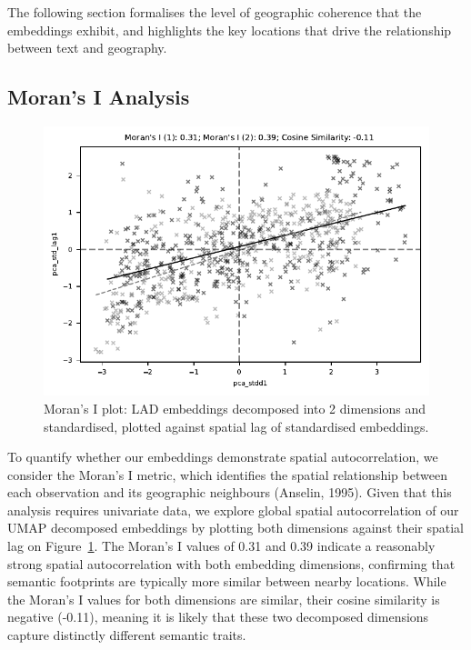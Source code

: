 \documentclass[
  letterpaper,
  11pt,
  english,
  onehalfspacing,
  headsepline]{MastersDoctoralThesis}
\begin{document}
The following section formalises the level of geographic coherence that
the embeddings exhibit, and highlights the key locations that drive the
relationship between text and geography.

\hypertarget{morans-i-analysis}{%
\subsection{Moran's I Analysis}\label{morans-i-analysis}}

\begin{figure}

{\centering \includegraphics{05_footprint/05_figures/fig-morans-output-1.pdf}

}

\caption{\label{fig-morans}Moran's I plot: LAD embeddings decomposed
into 2 dimensions and standardised, plotted against spatial lag of
standardised embeddings.}

\end{figure}

To quantify whether our embeddings demonstrate spatial autocorrelation,
we consider the Moran's I metric, which identifies the spatial
relationship between each observation and its geographic neighbours
(Anselin, 1995). Given that this analysis requires univariate data, we
explore global spatial autocorrelation of our UMAP decomposed embeddings
by plotting both dimensions against their spatial lag on
Figure~\ref{fig-morans}. The Moran's I values of 0.31 and 0.39 indicate
a reasonably strong spatial autocorrelation with both embedding
dimensions, confirming that semantic footprints are typically more
similar between nearby locations. While the Moran's I values for both
dimensions are similar, their cosine similarity is negative (-0.11),
meaning it is likely that these two decomposed dimensions capture
distinctly different semantic traits.
\end{document}

